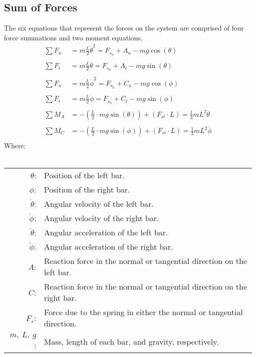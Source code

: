 \documentclass[12pt]{report}
\newcommand{\eqname}[1]{\tag*{#1}}%
\begin{document}
\begin{flushleft}
\section{Sum of Forces}
The six equations that represent the forces on the system are comprised of four force summations and two moment equations,
\begin{align}
  \sum F_n &= m\frac{L}{2}\dot{\theta}^2 = F_{s_n} + A_n - mg\cos(\theta) \label{force_left_bar_theta_normal} \\ \eqname{Sum of Normal Forces on the Left Bar ($\theta$)} \\
  \sum F_t &= m\frac{L}{2}\ddot{\theta} = F_{s_n} + A_t- mg\sin(\theta) \label{force_left_bar_theta_tangential} \\ \eqname{Sum of Tangential Forces on the Left Bar ($\theta$)} \\
  \sum F_n &= m\frac{L}{2}\dot{\phi}^2 = F_{s_n} + C_n - mg\cos(\phi) \label{force_right_bar_phi_normal} \\ \eqname{Sum of Normal Forces on the Right Bar ($\phi$)} \\
  \sum F_t &= m\frac{L}{2}\ddot{\phi} = F_{s_n} + C_t- mg\sin(\phi) \label{force_right_bar_phi_tangential} \\ \eqname{Sum of Tangential Forces on the Right Bar ($\phi$)} \\
  \sum M_A &= -\left(\frac{L}{2} \cdot mg\sin(\theta)\right) + \left(F_{st} \cdot L\right) = \frac{1}{3}mL^2\ddot{\theta} \label{moment_left_bar_theta} \\ \eqname{Sum of Moments about A ($\theta$)} \\
  \sum M_C &= -\left(\frac{L}{2} \cdot mg\sin(\phi)\right)+\left(F_{st} \cdot L\right) = \frac{1}{3}mL^2\ddot{\phi} \label{moment_right_bar_theta} \\ \eqname{Sum of Moments about C ($\phi$)}
\end{align}
Where: \\
~\\
\begin{tabular}{rl}
$\theta$:& Position of the left bar. \\
$\phi$:& Position of the right bar. \\
$\dot{\theta}$:& Angular velocity of the left bar. \\
$\dot{\phi}$:& Angular velocity of the right bar. \\
$\ddot{\theta}$:& Angular acceleration of the left bar. \\
$\ddot{\phi}$:& Angular acceleration of the right bar. \\
$A$:& Reaction force in the normal or tangential direction on the left bar. \\
$C$:& Reaction force in the normal or tangential direction on the right bar. \\
$F_s$:& Force due to the spring in either the normal or tangential direction. \\
$m,~L,~g$: & Mass, length of each bar, and gravity, respectively.
\end{tabular}


\end{flushleft}
\end{document}

